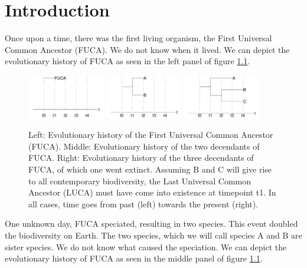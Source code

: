   \chapter{Introduction}
\label{chapter_introduction}
\newpage

\noindent

Once upon a time, there was the first living organism, the 
First Universal Common Ancestor (FUCA).
We do not know when it lived. We can depict the evolutionary
history of FUCA as seen in the left panel of figure \ref{fig:fuca}.

\begin{figure}[H]
  \includegraphics[width=0.3\textwidth]{t_0.png}
  \includegraphics[width=0.3\textwidth]{t_1.png}
  \includegraphics[width=0.3\textwidth]{t_3.png}
  \caption{
    Left: Evolutionary history of the First Universal Common Ancestor (FUCA).
    Middle: Evolutionary history of the two decendants of FUCA.
    Right: Evolutionary history of the three decendants of FUCA, 
    of which one went extinct.
    Assuming B and C will give rise to all contemporary biodiversity,
    the Last Universal Common Ancestor (LUCA) must have come into existence
    at timepoint t1.
    In all cases, time goes from past (left) towards the present (right).
  }
  \label{fig:fuca}
\end{figure}

One unknown day, FUCA speciated, resulting in two species.
This event doubled the biodiversity on Earth.
The two species, which we will call species A and B
are sister species.
We do not know what caused the speciation.
We can depict the evolutionary
history of FUCA as seen in the middle panel of figure \ref{fig:fuca}.

